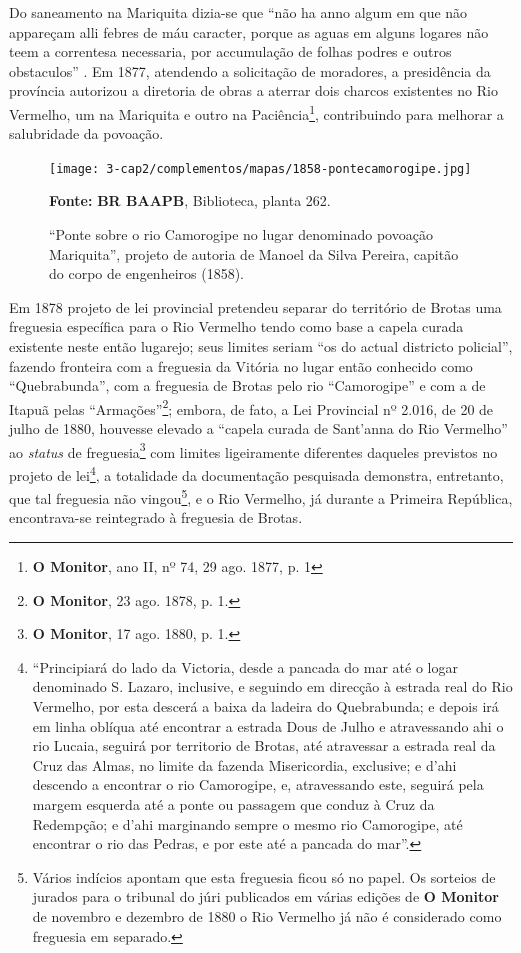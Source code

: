 Do saneamento na Mariquita dizia-se que ``não ha anno algum em que não appareçam alli febres de máu caracter, porque as aguas em alguns logares não teem a correntesa necessaria, por accumulação de folhas podres e outros obstaculos'' \cite[p.~20]{bahia_relatassleg_1873}. Em 1877, atendendo a solicitação de moradores, a presidência da província autorizou a diretoria de obras a aterrar dois charcos existentes no Rio Vermelho, um na Mariquita e outro na Paciência\footnote{\textbf{O Monitor}, ano II, nº 74, 29 ago. 1877, p. 1}, contribuindo para melhorar a salubridade da povoação.

\begin{figure}
\caption{``Ponte sobre o rio Camorogipe no lugar denominado povoação Mariquita'', projeto de autoria de Manoel da Silva Pereira, capitão do corpo de engenheiros (1858).}
\centering
\texttt{[image: 3-cap2/complementos/mapas/1858-pontecamorogipe.jpg]}{\footnotesize \par \textbf{Fonte:} \textbf{BR BAAPB}, Biblioteca, planta 262. \par}
\label{fig:pontecamorogipe}
\end{figure}

Em 1878 projeto de lei provincial pretendeu separar do território de Brotas uma freguesia específica para o Rio Vermelho tendo como base a capela curada existente neste então lugarejo; seus limites seriam ``os do actual districto policial'', fazendo fronteira com a freguesia da Vitória no lugar então conhecido como ``Quebrabunda'', com a freguesia de Brotas pelo rio ``Camorogipe'' e com a de Itapuã pelas ``Armações''\footnote{\textbf{O Monitor}, 23 ago. 1878, p. 1.}; embora, de fato, a Lei Provincial nº 2.016, de 20 de julho de 1880, houvesse elevado a ``capela curada de Sant'anna do Rio Vermelho'' ao \textit{status} de freguesia\footnote{\textbf{O Monitor}, 17 ago. 1880, p. 1.} com limites ligeiramente diferentes daqueles previstos no projeto de lei\footnote{``Principiará do lado da Victoria, desde a pancada do mar até o logar denominado S. Lazaro, inclusive, e seguindo em direcção à estrada real do Rio Vermelho, por esta descerá a baixa da ladeira do Quebrabunda; e depois irá em linha oblíqua até encontrar a estrada Dous de Julho e atravessando ahi o rio Lucaia, seguirá por territorio de Brotas, até atravessar a estrada real da Cruz das Almas, no limite da fazenda Misericordia, exclusive; e d'ahi descendo a encontrar o rio Camorogipe, e, atravessando este, seguirá pela margem esquerda até a ponte ou passagem que conduz à Cruz da Redempção; e d'ahi marginando sempre o mesmo rio Camorogipe, até encontrar o rio das Pedras, e por este até a pancada do mar''.}, a totalidade da documentação pesquisada demonstra, entretanto, que tal freguesia não vingou\footnote{Vários indícios apontam que esta freguesia ficou só no papel. Os sorteios de jurados para o tribunal do júri publicados em várias edições de \textbf{O Monitor} de novembro e dezembro de 1880 o Rio Vermelho já não é considerado como freguesia em separado.}, e o Rio Vermelho, já durante a Primeira República, encontrava-se reintegrado à freguesia de Brotas.

